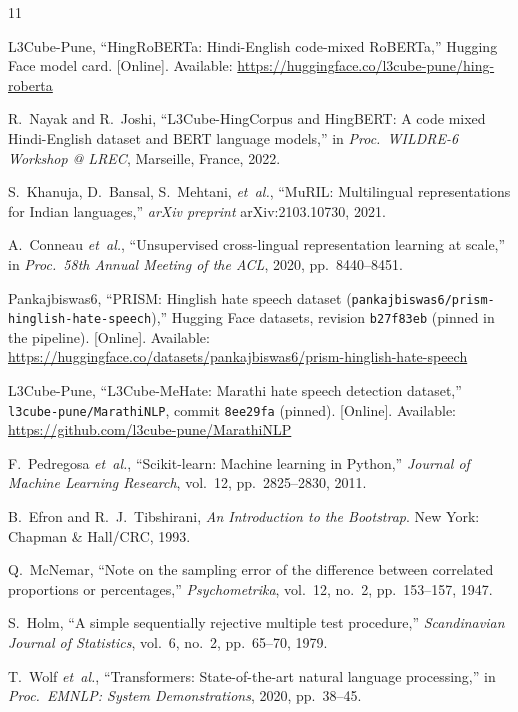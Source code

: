 \begin{thebibliography}{11}
\sloppy

L3Cube-Pune, ``HingRoBERTa: Hindi-English code-mixed RoBERTa,'' Hugging Face
model card. [Online]. Available: \url{https://huggingface.co/l3cube-pune/hing-roberta}


R.~Nayak and R.~Joshi, ``L3Cube-HingCorpus and HingBERT: A code mixed
Hindi-English dataset and BERT language models,'' in \emph{Proc.\ WILDRE-6
Workshop @ LREC}, Marseille, France, 2022.


S.~Khanuja, D.~Bansal, S.~Mehtani, \emph{et~al.}, ``MuRIL: Multilingual
representations for Indian languages,'' \emph{arXiv preprint} arXiv:2103.10730,
2021.


A.~Conneau \emph{et~al.}, ``Unsupervised cross-lingual representation learning at
scale,'' in \emph{Proc.\ 58th Annual Meeting of the ACL}, 2020, pp.~8440--8451.


Pankajbiswas6, ``PRISM: Hinglish hate speech dataset
(\texttt{pankajbiswas6/prism-hinglish-hate-speech}),'' Hugging Face datasets,
revision \texttt{b27f83eb} (pinned in the pipeline). [Online]. Available:
\url{https://huggingface.co/datasets/pankajbiswas6/prism-hinglish-hate-speech}


L3Cube-Pune, ``L3Cube-MeHate: Marathi hate speech detection dataset,''
\texttt{l3cube-pune/MarathiNLP}, commit \texttt{8ee29fa} (pinned). [Online].
Available: \url{https://github.com/l3cube-pune/MarathiNLP}


F.~Pedregosa \emph{et~al.}, ``Scikit-learn: Machine learning in Python,''
\emph{Journal of Machine Learning Research}, vol.~12, pp.~2825--2830, 2011.


B.~Efron and R.~J.~Tibshirani, \emph{An Introduction to the Bootstrap}.
New York: Chapman \& Hall/CRC, 1993.


Q.~McNemar, ``Note on the sampling error of the difference between correlated
proportions or percentages,'' \emph{Psychometrika}, vol.~12, no.~2,
pp.~153--157, 1947.


S.~Holm, ``A simple sequentially rejective multiple test procedure,''
\emph{Scandinavian Journal of Statistics}, vol.~6, no.~2, pp.~65--70, 1979.


T.~Wolf \emph{et~al.}, ``Transformers: State-of-the-art natural language
processing,'' in \emph{Proc.\ EMNLP: System Demonstrations}, 2020, pp.~38--45.

\end{thebibliography}
